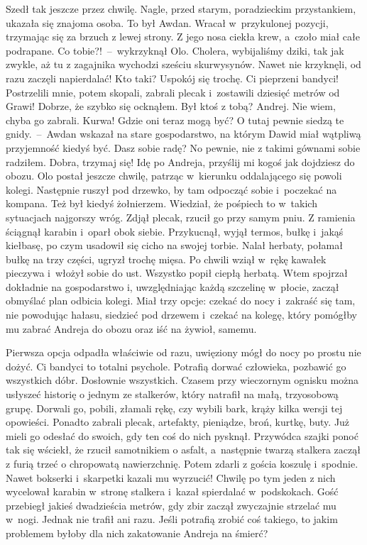 \documentclass[../MAIN.tex]{subfiles}
\begin{document}
Szedł tak jeszcze przez chwilę. Nagle, przed starym, poradzieckim przystankiem, ukazała się znajoma osoba. To był Awdan. Wracał w~przykulonej pozycji, trzymając się za brzuch z lewej strony. Z jego nosa ciekła krew, a~czoło miał całe podrapane.
\sd
\xx Co tobie?!~--~wykrzyknął Olo.
\xx Cholera, wybijaliśmy dziki, tak jak zwykle, aż tu z zagajnika wychodzi sześciu skurwysynów. Nawet nie krzyknęli, od razu zaczęli napierdalać!
\xx Kto taki? Uspokój się trochę.
\xx Ci pieprzeni bandyci! Postrzelili mnie, potem skopali, zabrali plecak i~zostawili dziesięć metrów od Grawi! Dobrze, że szybko się ocknąłem.
\xx Był ktoś z tobą?
\xx Andrej. Nie wiem, chyba go zabrali.
\xx Kurwa! Gdzie oni teraz mogą być?
\xx O tutaj pewnie siedzą te gnidy.~--~Awdan wskazał na stare gospodarstwo, na którym Dawid miał wątpliwą przyjemność kiedyś być.
\xx Dasz sobie radę?
\xx No pewnie, nie z takimi gównami sobie radziłem.
\xx Dobra, trzymaj się! Idę po Andreja, przyślij mi kogoś jak dojdziesz do obozu.
\qm
 Olo postał jeszcze chwilę, patrząc w~kierunku oddalającego się powoli kolegi. Następnie ruszył pod drzewko, by tam odpocząć sobie i~poczekać na kompana. Też był kiedyś żołnierzem. Wiedział, że pośpiech to w~takich sytuacjach najgorszy wróg. Zdjął plecak, rzucił go przy samym pniu. Z ramienia ściągnął karabin i~oparł obok siebie. Przykucnął, wyjął termos, bułkę i~jakąś kiełbasę, po czym usadowił się cicho na swojej torbie. Nalał herbaty, połamał bułkę na trzy części, ugryzł trochę mięsa. Po chwili wziął w~rękę kawałek pieczywa i~włożył sobie do ust. Wszystko popił ciepłą herbatą. Wtem spojrzał dokładnie na gospodarstwo i, uwzględniając każdą szczelinę w~płocie, zaczął obmyślać plan odbicia kolegi. Miał trzy opcje: czekać do nocy i~zakraść się tam, nie powodując hałasu, siedzieć pod drzewem i~czekać na kolegę, który pomógłby mu zabrać Andreja do obozu oraz iść na żywioł, samemu.

Pierwsza opcja odpadła właściwie od razu, uwięziony mógł do nocy po prostu nie dożyć. Ci bandyci to totalni psychole. Potrafią dorwać człowieka, pozbawić go wszystkich dóbr. Dosłownie wszystkich. Czasem przy wieczornym ognisku można usłyszeć historię o jednym ze stalkerów, który natrafił na małą, trzyosobową grupę. Dorwali go, pobili, złamali rękę, czy wybili bark, krąży kilka wersji tej opowieści. Ponadto zabrali plecak, artefakty, pieniądze, broń, kurtkę, buty. Już mieli go odesłać do swoich, gdy ten coś do nich pysknął. Przywódca szajki ponoć tak się wściekł, że rzucił samotnikiem o asfalt, a~następnie twarzą stalkera zaczął z furią trzeć o chropowatą nawierzchnię. Potem zdarli z gościa koszulę i~spodnie. Nawet bokserki i~skarpetki kazali mu wyrzucić! Chwilę po tym jeden z nich wycelował karabin w~stronę stalkera i~kazał spierdalać w~podskokach. Gość przebiegł jakieś dwadzieścia metrów, gdy zbir zaczął zwyczajnie strzelać mu w~nogi. Jednak nie trafił ani razu. Jeśli potrafią zrobić coś takiego, to jakim
problemem byłoby dla nich zakatowanie Andreja na śmierć?
\end{document}
